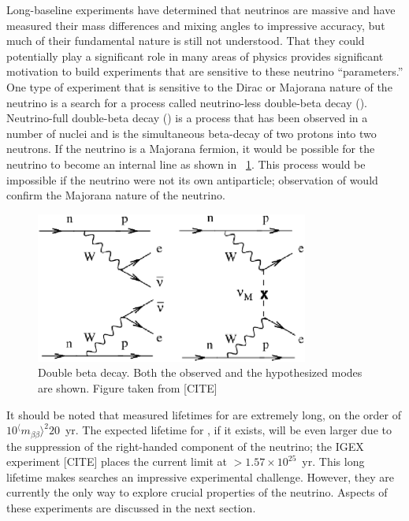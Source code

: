 Long-baseline experiments have determined that neutrinos are massive and have measured their mass differences and mixing angles to impressive accuracy, but much of their fundamental nature is still not understood.  That they could potentially play a significant role in many areas of physics provides significant motivation to build experiments that are sensitive to these neutrino ``parameters.'' One type of experiment that is sensitive to the Dirac or Majorana nature of the neutrino is a search for a process called neutrino-less double-beta decay (\zvbb).  Neutrino-full double-beta decay (\tvbb) is a process that has been observed in a number of nuclei and is the simultaneous beta-decay of two protons into two neutrons.  If the neutrino is a Majorana fermion, it would be possible for the neutrino to become an internal line as shown in {\fig}~\ref{fig:zvbb}.  This process would be impossible if the neutrino were not its own antiparticle; observation of \zvbb would confirm the Majorana nature of the neutrino. 
\begin{figure}[htp]
\centering
\includegraphics[width=0.8\textwidth]{figures/feynman2.eps}
\caption{Double beta decay.  Both the observed \tvbb and the hypothesized \zvbb modes are shown.  Figure taken from [CITE]}
\label{fig:zvbb}
\end{figure}
It should be noted that measured lifetimes for \tvbb are extremely long, on the order of $10^{\langle}m_{\beta\beta}{\rangle}^2{20}$~yr.  The expected lifetime for \zvbb, if it exists, will be even larger due to the suppression of the right-handed component of the neutrino; the IGEX experiment [CITE] places the current limit at $>1.57\times 10^{25}$~yr.  This long lifetime makes \zvbb searches an impressive experimental challenge.  However, they are currently the only way to explore crucial properties of the neutrino.  Aspects of these experiments are discussed in the next section.

